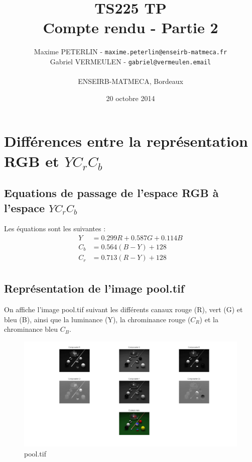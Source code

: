 \documentclass[11pt]{article}
\title{\textbf{TS225 TP}\\Compte rendu - Partie 2}
\author{Maxime PETERLIN - \texttt{maxime.peterlin@enseirb-matmeca.fr}\\
Gabriel VERMEULEN - \texttt{gabriel@vermeulen.email} \\\\{ENSEIRB-MATMECA, Bordeaux}}
\date{20 octobre 2014}
\begin{document}
\maketitle
\tableofcontents

\newpage

\section{Différences entre la représentation RGB et $YC_{r}C_{b}$}
	
	\subsection{Equations de passage de l'espace RGB à l'espace $YC_{r}C_{b}$}

		Les équations sont les suivantes :
		\begin{align*}
			Y &= 0.299 R + 0.587 G + 0.114 B\\
			C_{b} &= 0.564(B-Y) + 128\\
			C_{r} &= 0.713(R-Y) + 128\\
		\end{align*}

	\subsection{Représentation de l'image pool.tif}

		On affiche l'image pool.tif suivant les différents canaux rouge (R), vert (G) et bleu (B), ainsi que la luminance (Y), la chrominance rouge ($C_{R}$) et la chrominance bleu $C_{B}$.\\

		\begin{figure}[h]
			\centering
			\includegraphics[scale=0.25]{img/rapport_img1-1.jpg}
			\caption{pool.tif}
			\label{Q412}
		\end{figure}
\end{document}
